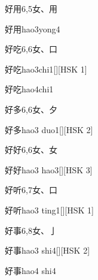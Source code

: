 \begin{entry}{好用}{6,5}{⼥、⽤}
  \begin{phonetics}{好用}{hao3yong4}
  \end{phonetics}
\end{entry}

\begin{entry}{好吃}{6,6}{⼥、⼝}
  \begin{phonetics}{好吃}{hao3chi1}[][HSK 1]
  \end{phonetics}
  \begin{phonetics}{好吃}{hao4chi1}
  \end{phonetics}
\end{entry}

\begin{entry}{好多}{6,6}{⼥、⼣}
  \begin{phonetics}{好多}{hao3 duo1}[][HSK 2]
  \end{phonetics}
\end{entry}

\begin{entry}{好好}{6,6}{⼥、⼥}
  \begin{phonetics}{好好}{hao3 hao3}[][HSK 3]
  \end{phonetics}
\end{entry}

\begin{entry}{好听}{6,7}{⼥、⼝}
  \begin{phonetics}{好听}{hao3 ting1}[][HSK 1]
  \end{phonetics}
\end{entry}

\begin{entry}{好事}{6,8}{⼥、⼅}
  \begin{phonetics}{好事}{hao3 shi4}[][HSK 2]
  \end{phonetics}
  \begin{phonetics}{好事}{hao4 shi4}
  \end{phonetics}
\end{entry}

